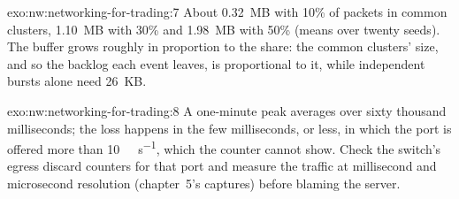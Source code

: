 \begin{solution}{exo:nw:networking-for-trading:7}
About 0.32~MB with 10\% of packets in common clusters, 1.10~MB with 30\% and 1.98~MB with 50\% (means over twenty seeds). The
buffer grows roughly in proportion to the share: the common clusters' size, and so the backlog each event leaves, is
proportional to it, while independent bursts alone need 26~KB.
\end{solution}

\begin{solution}{exo:nw:networking-for-trading:8}
A one-minute peak averages over sixty thousand milliseconds; the loss happens in the few milliseconds, or less, in which the
port is offered more than \qty{10}{\giga\bit\per\second}, which the counter cannot show. Check the switch's egress discard
counters for that port and measure the traffic at millisecond and microsecond resolution (chapter~5's captures) before blaming
the server.
\end{solution}

